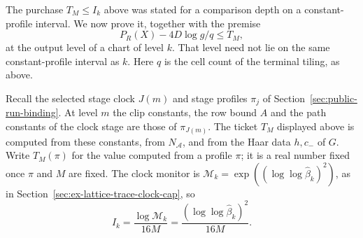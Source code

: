 The purchase $T_M\le I_k$ above was stated for a comparison depth on a
constant-profile interval. We now prove it, together with the premise
\begin{equation}\label{eq:rank-root-premise}
 P_R(X)-4D\log g/q\le T_M ,
\end{equation}
at the output level of a chart of level $k$. That level need not lie on
the same constant-profile interval as $k$. Here $q$ is the cell count of
the terminal tiling, as above.

Recall the selected stage clock $J(m)$ and stage profiles $\pi_j$ of
Section~\ref{sec:public-run-binding}. At level $m$ the clip constants,
the row bound $A$ and the path constants of the clock stage are those of
$\pi_{J(m)}$. The ticket $T_M$ displayed above is computed from these
constants, from $N_{\mathcal A}$, and from the Haar data $h,c_-$ of $G$.
Write $T_M(\pi)$ for the value computed from a profile $\pi$; it is a
real number fixed once $\pi$ and $M$ are fixed. The clock monitor is
$\mathcal M_k=\exp((\log\log\widehat\beta_k)^2)$, as in
Section~\ref{sec:ex-lattice-trace-clock-cap}, so
\[
 I_k=\frac{\log\mathcal M_k}{16M}=\frac{(\log\log\widehat\beta_k)^2}{16M}.
\]

